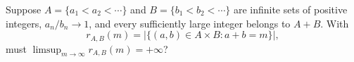 Suppose $A=\{a_1<a_2<\cdots\}$ and $B=\{b_1<b_2<\cdots\}$ are infinite sets of positive integers, $a_n/b_n\to1$, and every sufficiently large integer belongs to $A+B$. With
\[
r_{A,B}(m)=|\{(a,b)\in A\times B:a+b=m\}|,
\]
must $\limsup_{m\to\infty}r_{A,B}(m)=+\infty$?
